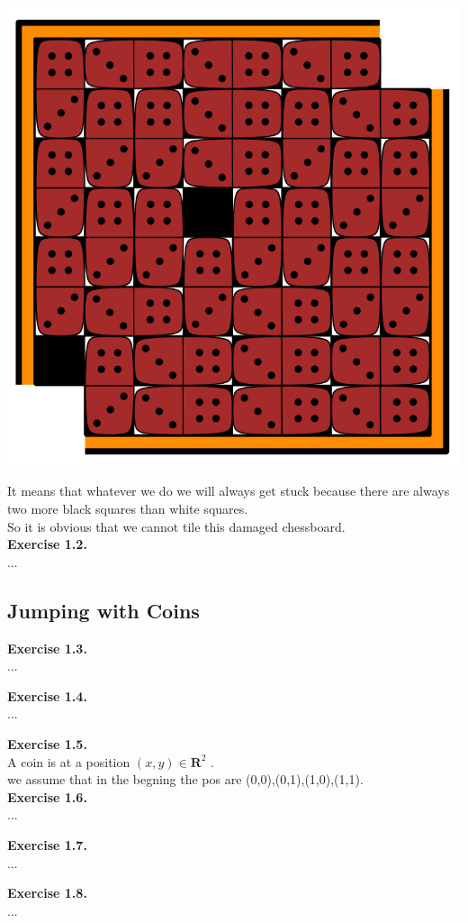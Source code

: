 \documentclass{article}
\begin{document}
\begin{flushleft}
\begin{center}
\includegraphics[scale=0.3]{2.png}
\end{center}
It means that whatever we do we will always get stuck because there are always two more black squares than white squares.\\
So it is obvious that we cannot tile this damaged chessboard.\\

\textbf{Exercise 1.2.} \\
...

\end{flushleft}
\subsection{Jumping with Coins}

\begin{flushleft}
\textbf{Exercise 1.3.} \\
...

\textbf{Exercise 1.4.} \\
...

\textbf{Exercise 1.5.} \\
A coin is at a position $(x,y)\in\mathbf{R}^2$ .\\
we assume that in the begning the pos are (0,0),(0,1),(1,0),(1,1).\\


\textbf{Exercise 1.6.} \\
...

\textbf{Exercise 1.7.} \\
...

\textbf{Exercise 1.8.} \\
...

\end{flushleft}
\end{document}

